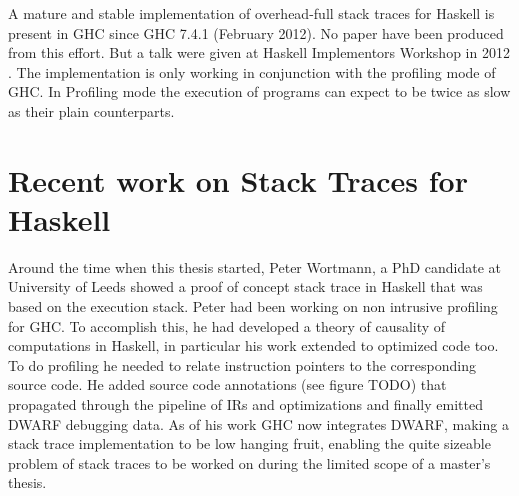 A mature and stable implementation of overhead-full stack traces for
Haskell is present in GHC since GHC 7.4.1 (February 2012). No paper have
been produced from this effort. But a talk were given at Haskell
Implementors Workshop in 2012 \cite{HIW2012Programme}.
The implementation is only working in conjunction with the profiling
mode of GHC. In Profiling mode the execution of programs can expect to
be twice as slow as their plain counterparts.

\section{Recent work on Stack Traces for Haskell} \label{sec:recent_work}

Around the time when this thesis started, Peter Wortmann, a
PhD candidate at University of Leeds showed a proof of concept
stack trace in Haskell that was based on the execution stack.
\cite{stack_traces_ticket} Peter had been working on non intrusive
profiling for GHC. To accomplish this, he had developed a theory of
causality of computations in Haskell, in particular his work extended to
optimized code too. \cite{DBLP:conf/haskell/WortmannD13} To do profiling
he needed to relate instruction pointers to the corresponding source
code. He added source code annotations (see figure TODO) that propagated
through the pipeline of IRs and optimizations and finally emitted DWARF
debugging data. As of his work GHC now integrates DWARF, making a
stack trace implementation to be low hanging fruit, enabling the quite
sizeable problem of stack traces to be worked on during the limited
scope of a master's thesis.
